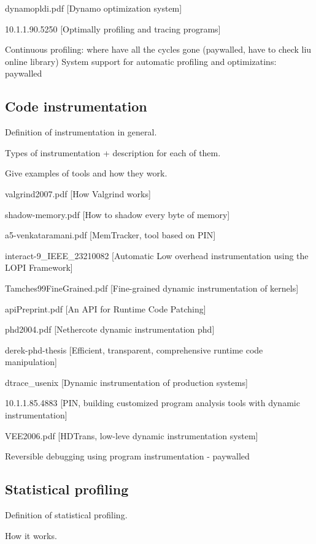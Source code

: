 dynamopldi.pdf [Dynamo optimization system]

10.1.1.90.5250 [Optimally profiling and tracing programs]

Continuous profiling: where have all the cycles gone (paywalled, have to check liu online library)
System support for automatic profiling and optimizatins: paywalled

\subsection{Code instrumentation}
\label{subsection:codeinstrumentation}

Definition of instrumentation in general.

Types of instrumentation + description for each of them.

Give examples of tools and how they work.

valgrind2007.pdf [How Valgrind works]

shadow-memory.pdf [How to shadow every byte of memory]

a5-venkataramani.pdf [MemTracker, tool based on PIN]

interact-9\_IEEE\_23210082 [Automatic Low overhead instrumentation using the LOPI Framework]

Tamches99FineGrained.pdf [Fine-grained dynamic instrumentation of kernels]

apiPreprint.pdf [An API for Runtime Code Patching]

phd2004.pdf [Nethercote dynamic instrumentation phd]

derek-phd-thesis [Efficient, transparent, comprehensive runtime code manipulation]

dtrace\_usenix [Dynamic instrumentation of production systems]

10.1.1.85.4883 [PIN, building customized program analysis tools with dynamic instrumentation]

VEE2006.pdf [HDTrans, low-leve dynamic instrumentation system]

Reversible debugging using program instrumentation - paywalled

\subsection{Statistical profiling}
\label{subsection:statisticalprofiling}

Definition of statistical profiling.

How it works.

